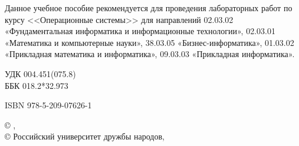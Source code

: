
\bigskip


Данное учебное пособие рекомендуется для проведения лабораторных работ
по курсу <<Операционные системы>> для направлений 02.03.02
«Фундаментальная информатика и информационные технологии», 02.03.01
«Математика и компьютерные науки», 38.03.05 «Бизнес-информатика»,
01.03.02 «Прикладная математика и информатика», 09.03.03 «Прикладная
информатика».

\vfill

\hfill
\begin{minipage}[t]{0.4\linewidth}
\begin{flushleft}
УДК  004.451(075.8) %
\\
ББК  018.2*32.973
\end{flushleft}
\end{minipage}



\vfill

\noindent
\begin{minipage}[t]{0.4\linewidth}
  \begin{flushleft}
    ISBN  978-5-209-07626-1
  \end{flushleft}
\end{minipage}
\hfill
\begin{minipage}[t]{0.6\linewidth}
  \begin{flushleft}
    \copyright{} %
    \bookauthorrev{}, \bookyear{} \\
    \copyright{} %
    Российский университет дружбы народов, %
    \bookyear{}
  \end{flushleft}
\end{minipage}


\clearpage


